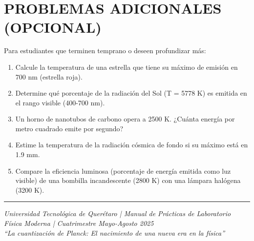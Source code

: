 \documentclass[12pt,a4paper]{article}
\begin{document}
	
	\section{PROBLEMAS ADICIONALES (OPCIONAL)}
	
	Para estudiantes que terminen temprano o deseen profundizar más:
	
	\begin{enumerate}
		\item Calcule la temperatura de una estrella que tiene su máximo de emisión en 700 nm (estrella roja).
		
		\item Determine qué porcentaje de la radiación del Sol (T = 5778 K) es emitida en el rango visible (400-700 nm).
		
		\item Un horno de nanotubos de carbono opera a 2500 K. ¿Cuánta energía por metro cuadrado emite por segundo?
		
		\item Estime la temperatura de la radiación cósmica de fondo si su máximo está en 1.9 mm.
		
		\item Compare la eficiencia luminosa (porcentaje de energía emitida como luz visible) de una bombilla incandescente (2800 K) con una lámpara halógena (3200 K).
	\end{enumerate}
	
	
	\vfill
	
	\begin{center}
		\hrule
		\vspace{0.3cm}
		\textcolor{uteqgray}{\textit{Universidad Tecnológica de Querétaro | Manual de Prácticas de Laboratorio}}\\
		\textcolor{uteqgray}{\textit{Física Moderna | Cuatrimestre Mayo-Agosto 2025}}\\
		\textcolor{uteqgray}{\textit{``La cuantización de Planck: El nacimiento de una nueva era en la física''}}
	\end{center}
	
\end{document}
